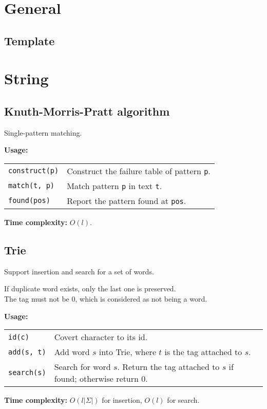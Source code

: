 
\newcommand{\BookNo}{0}
\newcommand{\BookTitle}{Miscellaneous}


\setmainfont{Times New Roman}
\setlength{\parskip}{0.0in}
\tableofcontents
\setlength{\parskip}{0.1in}
\newevenpage
\section{General}
\subsection{Template}


\section{String}
\subsection{Knuth-Morris-Pratt algorithm}
Single-pattern matching. \par
\textbf{Usage:} \\[0.1cm]
\begin{tabular}{p{2.5cm} p{9cm}}
  \lstinline|construct(p)| & Construct the failure table of pattern \lstinline|p|. \\
  \lstinline|match(t, p)| & Match pattern \lstinline|p| in text \lstinline|t|. \\
  \lstinline|found(pos)| & Report the pattern found at \lstinline|pos|. \\
\end{tabular} \par
\textbf{Time complexity:} $O(l)$. \par


\subsection{Trie} \label{trie}
Support insertion and search for a set of words. \par
\Warning If duplicate word exists, only the last one is preserved. \\
\Warning The tag must not be 0, which is considered as not being a word. \par
\textbf{Usage:} \\[0.1cm]
\begin{tabular}{p{2.5cm} p{9cm}}
  \lstinline|id(c)| & Covert character to its id.  \\
  \lstinline|add(s, t)| & Add word $s$ into Trie, where $t$ is the tag attached to $s$.  \\
  \lstinline|search(s)| & Search for word $s$. Return the tag attached to $s$ if found; otherwise return 0.  \\
\end{tabular} \par
\textbf{Time complexity:} $O(l|\Sigma|)$ for insertion, $O(l)$ for search. \par


